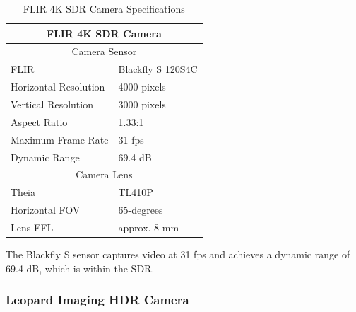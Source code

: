 \documentclass[../main.tex]{subfiles}
\begin{document}
\begin{table}[htbp]
\centering
\begin{tabular}{ll}
\hline
\multicolumn{2}{c}{FLIR 4K SDR Camera}\\
\hline
\hline
\multicolumn{2}{c}{Camera Sensor}\\
\hline
FLIR & Blackfly S 120S4C \\
Horizontal Resolution & 4000 pixels \\
Vertical Resolution & 3000 pixels \\
Aspect Ratio & 1.33:1 \\
Maximum Frame Rate & 31 fps \\
Dynamic Range & 69.4 dB \\
\multicolumn{2}{c}{Camera Lens}\\
\hline
Theia & TL410P\\
Horizontal \Ac{FOV} & 65-degrees\\
Lens \Ac{EFL} & approx. 8 mm\\
\hline
\end{tabular}
\caption{FLIR 4K SDR Camera Specifications}
\label{table:SDR_camera_specs}
\end{table}

The Blackfly S sensor captures video at 31 \ac{fps} and achieves a dynamic range of 69.4 dB, which is within the \ac{SDR}.

\subsubsection{Leopard Imaging HDR Camera} \label{sensors_HDR}
\end{document}
